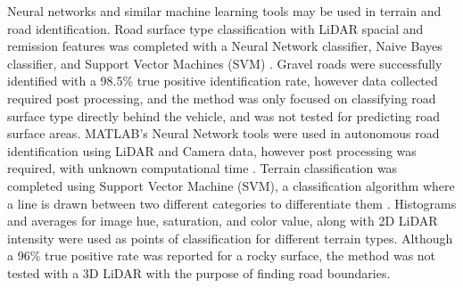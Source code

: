 \documentclass[numbered,pdftex]{ohio-etd}
\begin{document}
{{%
%			
		
		{Neural networks and similar machine learning tools may be used in terrain and road identification. Road surface type classification with LiDAR spacial and remission features was completed with a Neural Network classifier, Naive Bayes classifier, and Support Vector Machines (SVM) \cite{wang_road_nodate,wang_two-stage_2018}. Gravel roads were successfully identified with a 98.5\% true positive identification rate, however data collected required post processing, and the method was only focused on classifying road surface type directly behind the vehicle, and was not tested for predicting road surface areas. MATLAB's Neural Network tools were used in autonomous road identification using LiDAR and Camera data, however post processing was required, with unknown computational time \cite{rasmussen_combining_2002}. Terrain classification was completed using Support Vector Machine (SVM), a classification algorithm where a line is drawn between two different categories to differentiate them \cite{wietrzykowski_boosting_2014}. Histograms and averages for image hue, saturation, and color value, along with 2D LiDAR intensity were used as points of classification for different terrain types. Although a 96\% true positive rate was reported for a rocky surface, the method was not tested with a 3D LiDAR with the purpose of finding road boundaries. }
		
}}
\end{document}
